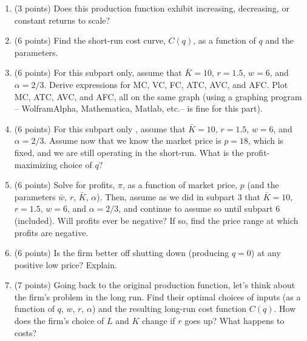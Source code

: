 \documentclass{article}
\begin{document}
\begin{enumerate}
\item (3 points) Does this production function exhibit increasing, decreasing, or constant returns to scale?
\item (6 points) Find the short-run cost curve, $C(q)$, as a function of $q$ and the parameters.
\item (6 points) For this subpart only, assume that $\bar{K} = 10$, $r = 1.5$, $w = 6$, and $\alpha = 2/3$. Derive expressions for MC, VC, FC, ATC, AVC, and AFC. Plot MC, ATC, AVC, and AFC, all on the same graph (using a graphing program – WolframAlpha, Mathematica, Matlab, etc.– is fine for this part).
\item (6 points) For this subpart only , assume that $\bar{K} = 10$, $r = 1.5$, $w = 6$, and $\alpha = 2/3$. Assume now that we know the market price is $p = 18$, which is fixed,
and we are still operating in the short-run. What is the profit-maximizing choice of $q$?
\item (6 points) Solve for profits, $\pi$, as a function of market price, $p$ (and the parameters $\bar{w}$, $r$, $\bar{K}$, $\alpha$). Then, assume as we did in subpart 3 that $\bar{K} = 10$, $r = 1.5$, $w = 6$, and $\alpha = 2/3$, and continue to assume so until subpart 6 (included). Will profits ever be negative? If so, find the price range at which profits are negative.
\item (6 points) Is the firm better off shutting down (producing $q = 0$) at any positive low price? Explain.
\item (7 points) Going back to the original production function, let’s think about the firm’s problem in the long run. Find their optimal choices of inputs (as a function 
of $q$, $w$, $r$, $\alpha$) and the resulting long-run cost function $C(q)$. How does the firm’s choice of $L$ and $K$ change if $r$ goes up? What happens to costs?
\end{enumerate}
\end{document}
